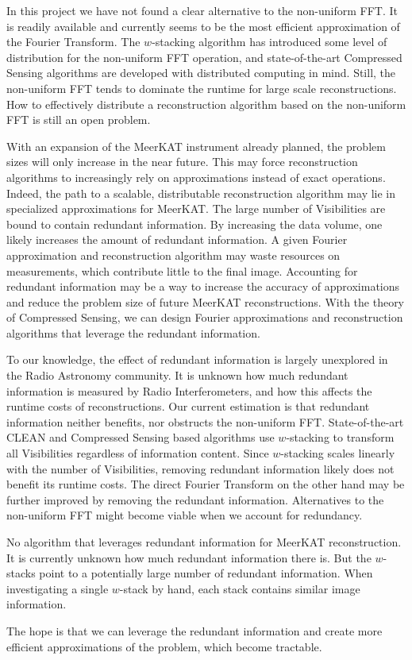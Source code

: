 In this project we have not found a clear alternative to the non-uniform FFT. It is readily available and currently seems to be the most efficient approximation of the Fourier Transform. The $w$-stacking algorithm\cite{offringa2014wsclean} has introduced some level of distribution for the non-uniform FFT operation, and state-of-the-art Compressed Sensing algorithms\cite{dabbech2018cygnus, pratley2018fast} are developed with distributed computing in mind. Still, the non-uniform FFT tends to dominate the runtime for large scale reconstructions. How to effectively distribute a reconstruction algorithm based on the non-uniform FFT is still an open problem.

With an expansion of the MeerKAT instrument already planned, the problem sizes will only increase in the near future. This may force reconstruction algorithms to increasingly rely on approximations instead of exact operations. Indeed, the path to a scalable, distributable reconstruction algorithm may lie in specialized approximations for MeerKAT. The large number of Visibilities are bound to contain redundant information. By increasing the data volume, one likely increases the amount of redundant information. A given Fourier approximation and reconstruction algorithm may waste resources on measurements, which contribute little to the final image. Accounting for redundant information may be a way to increase the accuracy of approximations and reduce the problem size of future MeerKAT reconstructions. With the theory of Compressed Sensing, we can design Fourier approximations and reconstruction algorithms that leverage the redundant information.

To our knowledge, the effect of redundant information is largely unexplored in the Radio Astronomy community. It is unknown how much redundant information is measured by Radio Interferometers, and how this affects the runtime costs of reconstructions. Our current estimation is that redundant information neither benefits, nor obstructs the non-uniform FFT. State-of-the-art CLEAN and Compressed Sensing based algorithms use $w$-stacking to transform all Visibilities regardless of information content. Since $w$-stacking scales linearly with the number of Visibilities, removing redundant information likely does not benefit its runtime costs. The direct Fourier Transform on the other hand may be further improved by removing the redundant information. Alternatives to the non-uniform FFT might become viable when we account for redundancy.

No algorithm that leverages redundant information for MeerKAT reconstruction. It is currently unknown how much redundant information there is. But the $w$-stacks point to a potentially large number of redundant information. When investigating a single $w$-stack by hand, each stack contains similar image information.

The hope is that we can leverage the redundant information and create more efficient approximations of the problem, which become tractable.















